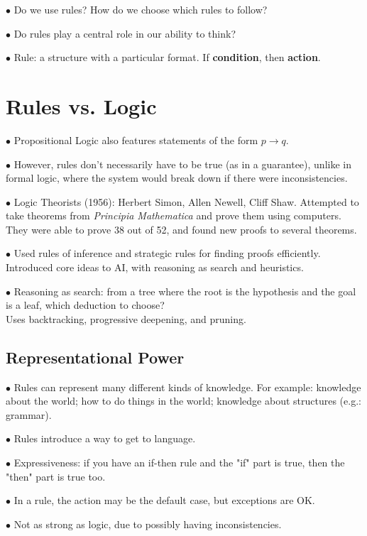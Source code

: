 \documentclass[english,openany]{book}
\begin{document}
$\bullet$ Do we use rules? How do we choose which rules to follow?

$\bullet$ Do rules play a central role in our ability to think?

$\bullet$ Rule: a structure with a particular format. If \textbf{condition}, then \textbf{action}.

\section{Rules vs. Logic}

$\bullet$ Propositional Logic also features statements of the form $p \rightarrow q$.

$\bullet$ However, rules don't necessarily have to be true (as in a guarantee), unlike in formal logic, where the system would break down if there were inconsistencies.

$\bullet$ Logic Theorists (1956): Herbert Simon, Allen Newell, Cliff Shaw. Attempted to take theorems from \textit{Principia Mathematica} and prove them using computers. They were able to prove 38 out of 52, and found new proofs to several theorems.

$\bullet$ Used rules of inference and strategic rules for finding proofs efficiently. Introduced core ideas to AI, with reasoning as search and heuristics.

$\bullet$ Reasoning as search: from a tree where the root is the hypothesis and the goal is a leaf, which deduction to choose?\\ Uses backtracking, progressive deepening, and pruning.

\subsection{Representational Power}

$\bullet$ Rules can represent many different kinds of knowledge. For example: knowledge about the world; how to do things in the world; knowledge about structures (e.g.: grammar).

$\bullet$ Rules introduce a way to get to language.

$\bullet$ Expressiveness: if you have an if-then rule and the "if" part is true, then the "then" part is true too.

$\bullet$ In a rule, the action may be the default case, but exceptions are OK.

$\bullet$ Not as strong as logic, due to possibly having inconsistencies.
\end{document}
